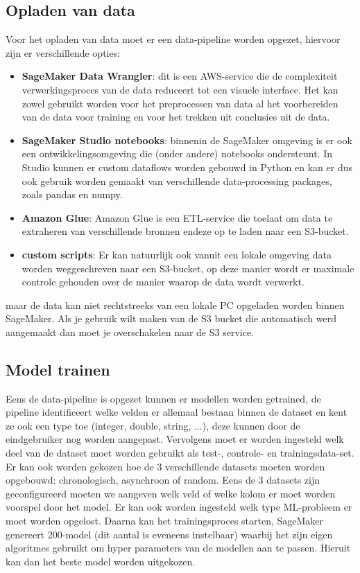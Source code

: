 \subsection{Opladen van data}
Voor het opladen van data moet er een data-pipeline worden opgezet, hiervoor zijn er verschillende opties:
\begin{itemize}
    \item \textbf{SageMaker Data Wrangler}: dit is een AWS-service die de complexiteit verwerkingsproces van de data reduceert tot een visuele interface. Het kan zowel gebruikt worden voor het preprocessen van data al het voorbereiden van de data voor training en voor het trekken uit conclusies uit de data.
    \item  \textbf{SageMaker Studio notebooks}: binnenin de SageMaker omgeving is er ook een ontwikkelingsomgeving die (onder andere) notebooks ondersteunt. In Studio kunnen er custom dataflows worden gebouwd in Python en kan er dus ook gebruik worden gemaakt van verschillende data-processing packages, zoals pandas en numpy.
    \item \textbf{Amazon Glue}:  Amazon Glue is een ETL-service die toelaat om data te extraheren van verschillende bronnen endeze op te laden naar een S3-bucket.
    \item \textbf{custom scripts}: Er kan natuurlijk ook vanuit een lokale omgeving data worden weggeschreven naar een S3-bucket, op deze manier wordt er maximale controle gehouden over de manier waarop de data wordt verwerkt. 
\end{itemize}

 maar de data kan niet rechtstreeks van een lokale PC opgeladen worden binnen SageMaker. Als je gebruik wilt maken van de S3 bucket die automatisch werd aangemaakt dan moet je overschakelen naar de S3 service. 

\subsection{Model trainen}
Eens de data-pipeline is opgezet kunnen er modellen worden getrained, de pipeline identificeert welke velden er allemaal bestaan binnen de dataset en kent ze ook een type toe (integer, double, string, ...), deze kunnen door de eindgebruiker nog worden aangepast. Vervolgens moet er worden ingesteld welk deel van de dataset moet worden gebruikt als test-, controle- en trainingsdata-set. Er kan ook worden gekozen hoe de 3 verschillende datasets moeten worden opgebouwd: chronologisch, asynchroon of random. Eens de 3 datasets zijn geconfigureerd moeten we aangeven welk veld of welke kolom er moet worden voorspel door het model. Er kan ook worden ingesteld welk type ML-probleem er moet worden opgelost. Daarna kan het trainingsproces starten, SageMaker genereert 200-model (dit aantal is eveneens instelbaar) waarbij het zijn eigen algoritmes gebruikt om hyper parameters van de modellen aan te passen. Hieruit kan dan het beste model worden uitgekozen. 

